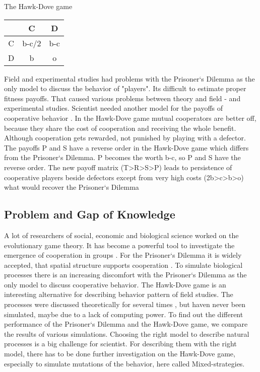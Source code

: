 The Hawk-Dove game

\begin{tabular}{|c|c|c|}
	\hline  & C & D \\ 
	\hline C & b-c/2 & b-c \\ 
	\hline D & b & o \\ 
	\hline 
\end{tabular} 
 
Field and experimental studies had problems with the Prisoner`s Dilemma as the only model to discuss the behavior of "players". Its difficult to estimate proper fitness payoffs. That caused various problems between theory and field -  and experimental studies. Scientist needed another model for the payoffs of cooperative behavior \citep{milinski1997, nowak1992}. In the Hawk-Dove game mutual cooperators are better off, because they share the cost of cooperation and receiving the whole benefit. Although cooperation gets rewarded, not punished by playing with a defector. The payoffs P and S have a reverse order in the Hawk-Dove game which differs from the Prisoner`s Dilemma. P becomes the worth b-c, so P and S have the reverse order. The new payoff matrix (T>R>S>P) leads to persistence of cooperative players beside defectors except from very high costs (2b>c>b>o) what would recover the Prisoner`s Dilemma \citep{HauertandDoebeli2004} 

\subsection{Problem and Gap of Knowledge}
A lot of researchers of social, economic and biological science worked on the evolutionary game theory. It has become a powerful tool to investigate the emergence of cooperation in groups \citep{HauertandDoebeli2004}. For the Prisoner`s Dilemma it is widely accepted, that spatial structure supports cooperation \citep{margules2000}. To simulate biological processes there is an increasing discomfort with the Prisoner`s Dilemma as the only model to discuss cooperative behavior. The Hawk-Dove game is an interesting alternative for describing behavior pattern of field studies\citep{milinski1987}. The processes were discussed theoretically for several times \citep{nowak1992, milinski1987}, but haven never been simulated, maybe due to a lack of computing power.  To find out the different performance of  the Prisoner`s Dilemma and  the  Hawk-Dove game, we compare the results of various simulations. Choosing the right model to describe natural processes is a big challenge for scientist. For describing them with the right model, there has to be done further investigation on the Hawk-Dove game, especially to simulate mutations of the behavior, here called Mixed-strategies. 

